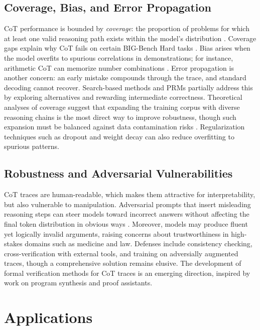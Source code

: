 \documentclass[11pt,a4paper]{article}
\begin{document}
\subsection{Coverage, Bias, and Error Propagation}
CoT performance is bounded by \textit{coverage}: the proportion of problems for which at least one valid reasoning path exists within the model's distribution \citep{wang2022self}. Coverage gaps explain why CoT fails on certain BIG-Bench Hard tasks \citep{suzgun2022challenging}. Bias arises when the model overfits to spurious correlations in demonstrations; for instance, arithmetic CoT can memorize number combinations \citep{ye2022unreliability}. Error propagation is another concern: an early mistake compounds through the trace, and standard decoding cannot recover. Search-based methods and PRMs partially address this by exploring alternatives and rewarding intermediate correctness. Theoretical analyses of coverage suggest that expanding the training corpus with diverse reasoning chains is the most direct way to improve robustness, though such expansion must be balanced against data contamination risks \citep{srivastava2022beyond}. Regularization techniques such as dropout and weight decay can also reduce overfitting to spurious patterns.

\subsection{Robustness and Adversarial Vulnerabilities}
CoT traces are human-readable, which makes them attractive for interpretability, but also vulnerable to manipulation. Adversarial prompts that insert misleading reasoning steps can steer models toward incorrect answers without affecting the final token distribution in obvious ways \citep{ye2022unreliability}. Moreover, models may produce fluent yet logically invalid arguments, raising concerns about trustworthiness in high-stakes domains such as medicine and law. Defenses include consistency checking, cross-verification with external tools, and training on adversially augmented traces, though a comprehensive solution remains elusive. The development of formal verification methods for CoT traces is an emerging direction, inspired by work on program synthesis and proof assistants.

\section{Applications}
\label{sec:applications}
\end{document}
